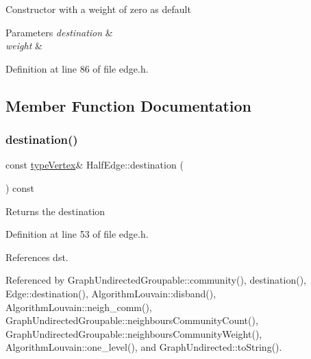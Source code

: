 Constructor with a weight of zero as default 
\begin{DoxyParams}{Parameters}
{\em destination} & \\
\hline
{\em weight} & \\
\hline
\end{DoxyParams}


Definition at line 86 of file edge.\+h.



\subsection{Member Function Documentation}
\mbox{\label{classHalfEdge_a98c0fb1c54506abbd3c0ac4a1264dac1}} 
\subsubsection{\texorpdfstring{destination()}{destination()}\hspace{0.1cm}{\footnotesize\ttfamily [1/2]}}
{\footnotesize\ttfamily const \hyperlink{edge_8h_a5fbd20c46956d479cb10afc9855223f6}{type\+Vertex}\& Half\+Edge\+::destination (\begin{DoxyParamCaption}{ }\end{DoxyParamCaption}) const\hspace{0.3cm}{\ttfamily [inline]}}

\begin{DoxyReturn}{Returns}
the destination 
\end{DoxyReturn}


Definition at line 53 of file edge.\+h.



References dst.



Referenced by Graph\+Undirected\+Groupable\+::community(), destination(), Edge\+::destination(), Algorithm\+Louvain\+::disband(), Algorithm\+Louvain\+::neigh\+\_\+comm(), Graph\+Undirected\+Groupable\+::neighbours\+Community\+Count(), Graph\+Undirected\+Groupable\+::neighbours\+Community\+Weight(), Algorithm\+Louvain\+::one\+\_\+level(), and Graph\+Undirected\+::to\+String().

\mbox{\label{classHalfEdge_ac9f0f75077407355bde248e083d98161}} 
